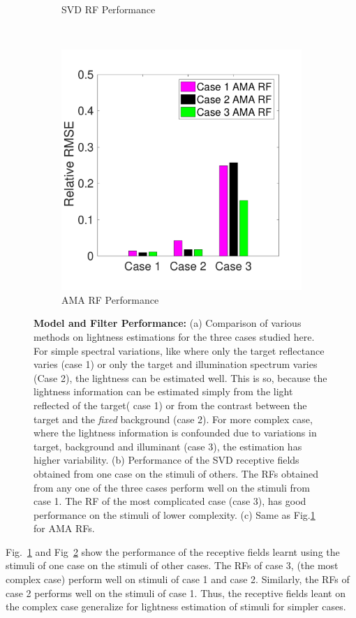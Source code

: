 \documentclass{jov}
\begin{document}
\begin{figure}
\begin{subfigure}{0.3 \textwidth}
	\caption{SVD RF Performance}
	\label{fig:SVDBAR}
    \end{subfigure}
    ~ %
        \begin{subfigure}{0.3 \textwidth}
	\includegraphics[width=\textwidth]{../Figures/Figure14/Figure14_c.pdf}
	\caption{AMA RF Performance}
	\label{fig:AMABAR}
    \end{subfigure}
\caption{{\bf Model and Filter Performance:} (a) Comparison of various methods on lightness estimations for the three cases studied here. For simple spectral variations, like where only the target reflectance varies (case 1) or only the target and illumination spectrum varies (Case 2), the lightness can be estimated well. This is so, because the lightness information can be estimated simply from the light reflected of the target( case 1) or from the contrast between the target and the {\it fixed} background (case 2). For more complex case, where the lightness information is confounded due to variations in target, background and illuminant (case 3), the estimation has higher variability. (b) Performance of the SVD receptive fields obtained from one case on the stimuli of others. The RFs obtained from any one of the three cases perform well on the stimuli from case 1. The RF of the most complicated case (case 3), has good performance on the stimuli of lower complexity. (c) Same as Fig.\ref{fig:SVDBAR} for AMA RFs.}
 \label{fig:barGraphs}
\end{figure}
Fig.~\ref{fig:SVDBAR} and Fig~\ref{fig:AMABAR} show the performance of the receptive fields learnt using the stimuli of one case on the stimuli of other cases. The RFs of case 3, (the most complex case) perform well on stimuli of case 1 and case 2.  Similarly, the RFs of case 2 performs well on the stimuli of case 1. Thus, the receptive fields leant on the complex case generalize for lightness estimation of stimuli for simpler cases.
\end{document}
